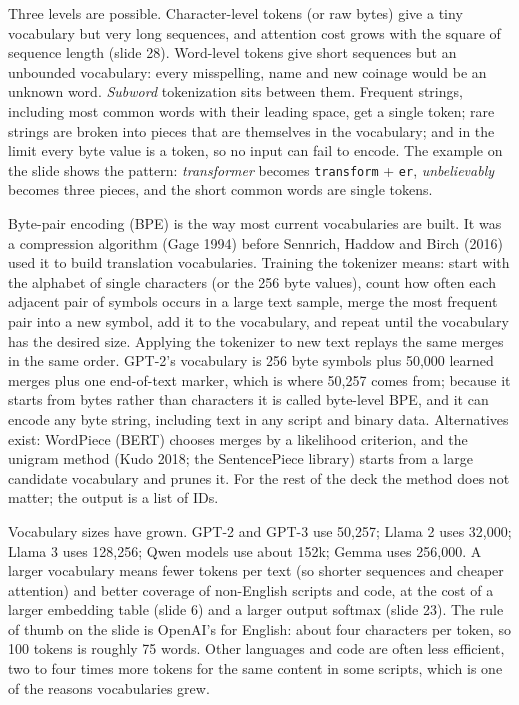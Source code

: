 \documentclass[11pt,letterpaper]{article}
\begin{document}
Three levels are possible. Character-level tokens (or raw bytes) give a tiny vocabulary but very long sequences, and attention cost grows with the square of sequence length (slide 28). Word-level tokens give short sequences but an unbounded vocabulary: every misspelling, name and new coinage would be an unknown word. \emph{Subword} tokenization sits between them. Frequent strings, including most common words with their leading space, get a single token; rare strings are broken into pieces that are themselves in the vocabulary; and in the limit every byte value is a token, so no input can fail to encode. The example on the slide shows the pattern: \emph{transformer} becomes \texttt{\textvisiblespace transform} + \texttt{er}, \emph{unbelievably} becomes three pieces, and the short common words are single tokens.

Byte-pair encoding (BPE) is the way most current vocabularies are built. It was a compression algorithm (Gage 1994) before Sennrich, Haddow and Birch (2016) used it to build translation vocabularies. Training the tokenizer means: start with the alphabet of single characters (or the 256 byte values), count how often each adjacent pair of symbols occurs in a large text sample, merge the most frequent pair into a new symbol, add it to the vocabulary, and repeat until the vocabulary has the desired size. Applying the tokenizer to new text replays the same merges in the same order. GPT-2's vocabulary is 256 byte symbols plus 50,000 learned merges plus one end-of-text marker, which is where 50,257 comes from; because it starts from bytes rather than characters it is called byte-level BPE, and it can encode any byte string, including text in any script and binary data. Alternatives exist: WordPiece (BERT) chooses merges by a likelihood criterion, and the unigram method (Kudo 2018; the SentencePiece library) starts from a large candidate vocabulary and prunes it. For the rest of the deck the method does not matter; the output is a list of IDs.

Vocabulary sizes have grown. GPT-2 and GPT-3 use 50,257; Llama 2 uses 32,000; Llama 3 uses 128,256; Qwen models use about 152k; Gemma uses 256,000. A larger vocabulary means fewer tokens per text (so shorter sequences and cheaper attention) and better coverage of non-English scripts and code, at the cost of a larger embedding table (slide 6) and a larger output softmax (slide 23). The rule of thumb on the slide is OpenAI's for English: about four characters per token, so 100 tokens is roughly 75 words. Other languages and code are often less efficient, two to four times more tokens for the same content in some scripts, which is one of the reasons vocabularies grew.
\end{document}
